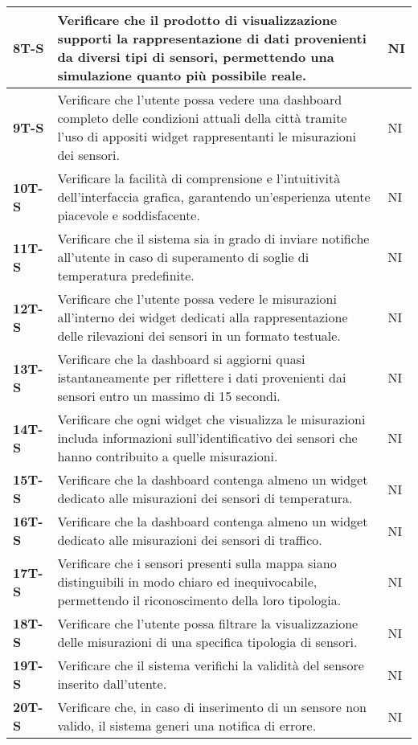 \begin{longtable}{|>{\raggedright\arraybackslash}m{}|>{\raggedright\arraybackslash}m{}|>{\raggedright\arraybackslash}m{}|}
	\textbf{8T-S}   & Verificare che il prodotto di visualizzazione supporti la rappresentazione di dati provenienti da diversi tipi di sensori, permettendo una simulazione quanto più possibile reale. & NI\\
	\hline
	\textbf{9T-S}   & Verificare che l'utente possa vedere una dashboard completo delle condizioni attuali della città tramite l'uso di appositi widget rappresentanti le misurazioni dei sensori. & NI\\
	\hline
	\textbf{10T-S}   & Verificare la facilità di comprensione e l'intuitività dell'interfaccia grafica, garantendo un'esperienza utente piacevole e soddisfacente. & NI\\
	\hline
	\textbf{11T-S}   & Verificare che il sistema sia in grado di inviare notifiche all'utente in caso di superamento di soglie di temperatura predefinite. & NI\\
	\hline
	\textbf{12T-S}   & Verificare che l’utente possa vedere le misurazioni all’interno dei widget dedicati alla rappresentazione delle rilevazioni dei sensori in un formato testuale. & NI\\
	\hline
	\textbf{13T-S}   & Verificare che la dashboard si aggiorni quasi istantaneamente per riflettere i dati provenienti dai sensori entro un massimo di 15 secondi. & NI\\
	\hline
	\textbf{14T-S}   & Verificare che ogni widget che visualizza le misurazioni includa informazioni sull’identificativo dei sensori che hanno contribuito a quelle misurazioni. & NI\\
	\hline
	\textbf{15T-S}   & Verificare che la dashboard contenga almeno un widget dedicato alle misurazioni dei sensori di temperatura. & NI\\
	\hline
	\textbf{16T-S}   & Verificare che la dashboard contenga almeno un widget dedicato alle misurazioni dei sensori di traffico. & NI\\
	\hline
	\textbf{17T-S}   & Verificare che i sensori presenti sulla mappa siano distinguibili in modo chiaro ed inequivocabile, permettendo il riconoscimento della loro tipologia. & NI\\
	\hline
	\textbf{18T-S}   & Verificare che l’utente possa filtrare la visualizzazione delle misurazioni di una specifica tipologia di sensori. & NI\\
	\hline
	\textbf{19T-S}   & Verificare che il sistema verifichi la validità del sensore inserito dall’utente. & NI\\
	\hline
	\textbf{20T-S}   & Verificare che, in caso di inserimento di un sensore non valido, il sistema generi una notifica di errore. & NI\\

\end{longtable}
